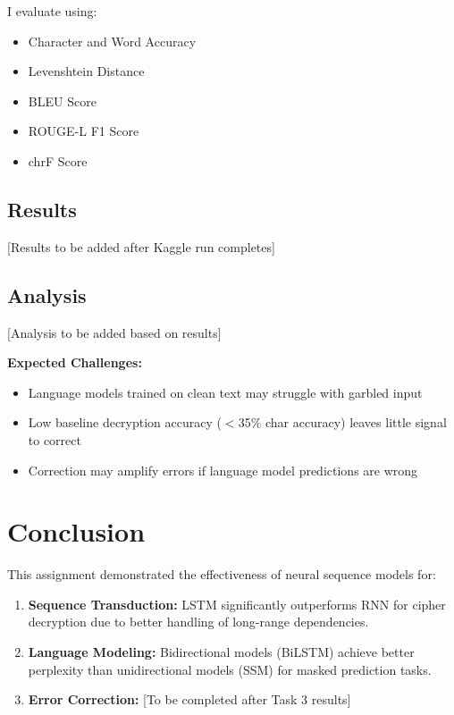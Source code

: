\documentclass[12pt]{article}
\begin{document}
I evaluate using:
\begin{itemize}
    \item Character and Word Accuracy
    \item Levenshtein Distance
    \item BLEU Score
    \item ROUGE-L F1 Score
    \item chrF Score
\end{itemize}

\subsection{Results}

[Results to be added after Kaggle run completes]

\subsection{Analysis}

[Analysis to be added based on results]

\textbf{Expected Challenges:}
\begin{itemize}
    \item Language models trained on clean text may struggle with garbled input
    \item Low baseline decryption accuracy ($<$35\% char accuracy) leaves little signal to correct
    \item Correction may amplify errors if language model predictions are wrong
\end{itemize}

\section{Conclusion}

This assignment demonstrated the effectiveness of neural sequence models for:
\begin{enumerate}
    \item \textbf{Sequence Transduction:} LSTM significantly outperforms RNN for cipher decryption due to better handling of long-range dependencies.
    \item \textbf{Language Modeling:} Bidirectional models (BiLSTM) achieve better perplexity than unidirectional models (SSM) for masked prediction tasks.
    \item \textbf{Error Correction:} [To be completed after Task 3 results]
\end{enumerate}
\end{document}
